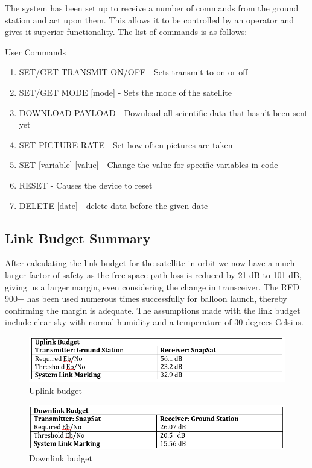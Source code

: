 \noindent
The system has been set up to receive a number of commands from the ground station and act upon them. This allows it to be controlled by an operator and gives it superior functionality. The list of commands is as follows:

\noindent
User Commands
\begin{enumerate}
    \item	SET/GET TRANSMIT ON/OFF - Sets transmit to on or off
    \item	SET/GET MODE [mode]  - Sets the mode of the satellite
    \item	DOWNLOAD PAYLOAD - Download all scientific data that hasn’t been sent yet
    \item	SET PICTURE RATE - Set how often pictures are taken
    \item	SET [variable] [value] - Change the value for specific variables in code
    \item	RESET - Causes the device to reset
    \item	DELETE [date] - delete data before the given date
    
\end{enumerate}

\subsection{Link Budget Summary}
After calculating the link budget for the satellite in orbit we now have a much larger factor of safety as the free space path loss is reduced by 21 dB to 101 dB, giving us a larger margin, even considering the change in transceiver. The RFD 900+ has been used numerous times successfully for balloon launch, thereby confirming the margin is adequate. The assumptions made with the link budget include clear sky with normal humidity and a temperature of 30 degrees Celsius.
\begin{figure}[H]
    \centering
    \includegraphics[width=\linewidth]{./figures/uplink}
    \caption{Uplink budget}
\end{figure}
\begin{figure}[H]
    \centering
    \includegraphics[width=\linewidth]{./figures/downlink}
    \caption{Downlink budget}
\end{figure}